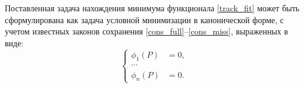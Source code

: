 %

Поставленная задача нахождения минимума функционала \eqref{track_fit} может быть сформулирована как задача условной минимизации в канонической форме, с учетом известных законов сохранения \eqref{cons_full}--\eqref{cons_miss}, выраженных в виде:
\begin{equation}
\label{eq:constr}
\left\{
\begin{aligned}
\phi_1(P) &= 0,\\
\cdots\\
\phi_n(P) &= 0.
\end{aligned}
\right.
\end{equation}
